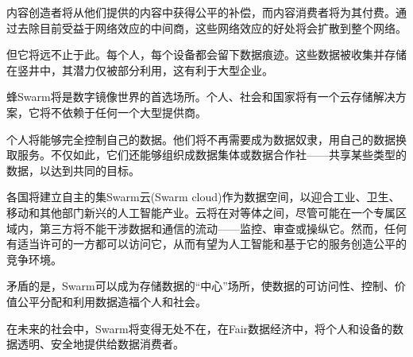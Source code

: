 内容创造者将从他们提供的内容中获得公平的补偿，而内容消费者将为其付费。通过去除目前受益于网络效应的中间商，这些网络效应的好处将会扩散到整个网络。

但它将远不止于此。每个人，每个设备都会留下数据痕迹。这些数据被收集并存储在竖井中，其潜力仅被部分利用，这有利于大型企业。

蜂Swarm将是数字镜像世界的首选场所。个人、社会和国家将有一个云存储解决方案，它将不依赖于任何一个大型提供商。 


个人将能够完全控制自己的数据。他们将不再需要成为数据奴隶，用自己的数据换取服务。不仅如此，它们还能够组织成数据集体或数据合作社——共享某些类型的数据，以达到共同的目标。

各国将建立自主的集Swarm云(Swarm cloud)作为数据空间，以迎合工业、卫生、移动和其他部门新兴的人工智能产业。云将在对等体之间，尽管可能在一个专属区域内，第三方将不能干涉数据和通信的流动——监控、审查或操纵它。然而，任何有适当许可的一方都可以访问它，从而有望为人工智能和基于它的服务创造公平的竞争环境。

矛盾的是，Swarm可以成为存储数据的“中心”场所，使数据的可访问性、控制、价值公平分配和利用数据造福个人和社会。

在未来的社会中，Swarm将变得无处不在，在Fair数据经济中，将个人和设备的数据透明、安全地提供给数据消费者。

